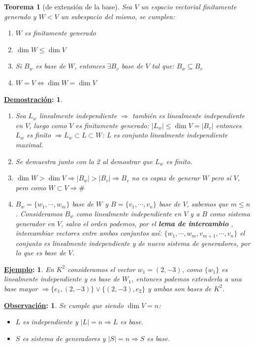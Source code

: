\documentclass[10pt,a4paper,openright]{book}
\theoremstyle{break}
\newtheorem*{theo}{Teorema}
\newtheorem*{demo}{\underline{Demostración}:}
\newtheorem*{obs}{\underline{Observación}:}
\newtheorem*{ej}{\underline{Ejemplo}:}
\begin{document}
\begin{theo}[de extensión de la base]
Sea $V$ un espacio vectorial finitamente generado y $W<V$ un subespacio del mismo, se cumplen:
\begin{enumerate}
\item $W$ es finitamente generado
\item $\dim W\leq \dim V$
\item Si $B_w$ es base de $W$, entonces $\exists B_v$ base de $V$ tal que: $B_w\subseteq B_v$
\item $W=V\Leftrightarrow \dim W=\dim V$
\end{enumerate}
\end{theo}
\begin{demo}
\begin{enumerate}
\item Sea $L_w$ linealmente independiente $\Rightarrow $ también es linealmente independiente en $V$, luego como $V$ es finitamente generado: $|L_w|\leq \dim V=|B_v|$ entonces $L_w$ es finito $\Rightarrow L_w\subset L\subset W$: L es conjunto linealmente independiente maximal.

\item Se demuestra junto con la 2 al demostrar que $L_w$ es finito.

\item $\dim W>\dim V\Rightarrow |B_w|>|B_v|\Rightarrow B_v$ no es capaz de generar $W$ pero sí $V$, pero como $W\subset V\Rightarrow \#$

\item $B_w=\{w_1,\cdots, w_m\}$ base de $W$ y $B=\{v_1,\cdots, v_n\}$ base de $V$, sabemos que $m\leq n$. Consideramos $B_w$ como linealmente independiente en $V$ y a $B$ como sistema generador en $V$, salvo el orden podemos, por el \textbf{lema de intercambio} , intercambiar vectores entre ambos conjuntos así: $\{w_1, \cdots , w_m, v_{m+1}, \cdots , v_n \}$ el conjunto es linealmente independiente y de nuevo sistema de generadores, por lo que es base de $V$.
\end{enumerate}
\end{demo}

\begin{ej}
En $K^2$ consideramos el vector $w_1=(2,-3)$, como $\{w_1\}$ es linealmente independiente y es base de $W_1$, entonces podemos extenderla a una base mayor $\Rightarrow \{e_1,(2,-3)\} \vee \{(2,-3), e_2\}$ y ambas son bases de $K^2$.
\end{ej}
\begin{obs}
Se cumple que siendo $\dim V=n$:
\begin{itemize}
\item $L$ es independiente y $|L|=n \Rightarrow L$ es base.
\item $S$ es sistema de generadores y $|S|=n\Rightarrow S $ es base. 
\end{itemize}
\end{obs}
\end{document}
